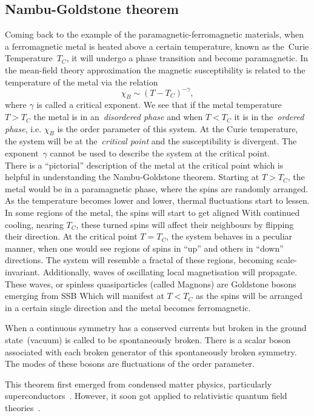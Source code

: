 \subsection{Nambu-Goldstone theorem}
Coming back to the example of the paramagnetic-ferromagnetic materials, when a ferromagnetic metal is heated above a certain temperature, known as the~{Curie Temperature}~$T_C$, it will undergo a phase transition and become paramagnetic. In the mean-field theory approximation the magnetic susceptibility is related to the temperature of the metal via the relation
\begin{equation}
    \chi_B \sim (T-T_C)^{-\gamma},
\end{equation}  
where $\gamma$ is called a critical exponent. We see that if the metal temperature $T>T_C$ the metal is in an~\textit{disordered phase} and when $T<T_C$ it is in the~\textit{ordered phase}, i.e. $\chi_B$ is the {order parameter} of this system. At the Curie temperature, the system will be at the~\textit{critical point} and the susceptibility is divergent. The exponent~$\gamma$ cannot be used to describe the system at the critical point. \\ There is a ``pictorial'' description of the metal at the critical point which is helpful in understanding the Nambu-Goldstone  theorem. Starting at $T>T_C$, the metal would be in a paramagnetic phase, where the spins are randomly arranged. As the temperature becomes lower and lower, thermal fluctuations start to lessen. In some regions of the metal, the spins will start to get aligned With continued cooling, nearing $T_C$, these turned spins will affect their neighbours by flipping their direction. At the critical point $T=T_C$, the system behaves in a peculiar manner, when one would see regions of spins in ``up'' and others in ``down'' directions. The system will resemble a fractal of these regions, becoming scale-invariant. Additionally, waves of oscillating local magnetisation will propagate. These waves, or spinless quasiparticles (called {Magnons}) are Goldstone bosons emerging from SSB Which will manifest at $T<T_C$ as the spins will be  arranged in a certain single direction and the metal becomes ferromagnetic.
 \begin{tcolorbox}[title=The Nambu-Goldstone theorem,
	title filled=false,
	colback=Mahogany!5!white,
	colframe=Mahogany]
When a continuous symmetry has a conserved currents but broken in the ground state~(vacuum) is called to be spontaneously broken. There is a scalar boson associated with each broken generator of this spontaneously broken symmetry. The modes of these bosons are fluctuations of the order parameter.
\end{tcolorbox}
This theorem first emerged from condensed matter physics, particularly superconductors~\cite{PhysRev.117.648,goldstone}. However, it soon got applied to relativistic quantum field theories~\cite{PhysRev.127.965}.
